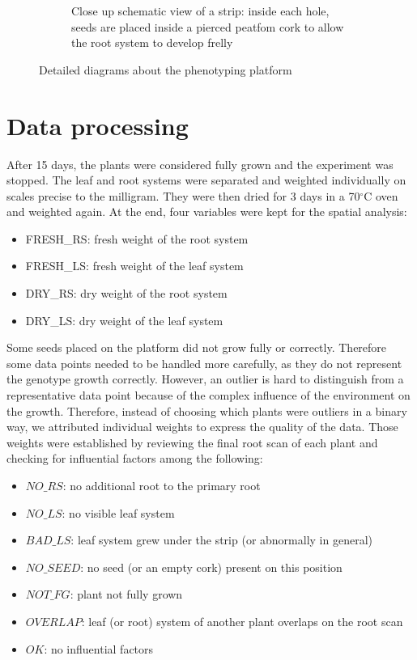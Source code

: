 \begin{figure}[!htb]
\begin{subfigure}[b]{0.475\textwidth}
            \caption{Close up schematic view of a strip: inside each hole, seeds are placed inside a pierced peatfom cork to allow the root system to develop frelly}    
            \label{fig:seed_platform_close_up}
        \end{subfigure}
        \caption{Detailed diagrams about the phenotyping platform}
    \end{figure}


\section{Data processing}
After 15 days, the plants were considered fully grown and the experiment was stopped. The leaf and root systems were separated and weighted individually on scales precise to the milligram. They were then dried for 3 days in a 70$^{\circ}$C oven and weighted again. At the end, four variables were kept for the spatial analysis:

\begin{itemize}
\item FRESH\_RS: fresh weight of the root system
\item FRESH\_LS: fresh weight of the leaf system
\item DRY\_RS: dry weight of the root system
\item DRY\_LS: dry weight of the leaf system
\end{itemize} 

Some seeds placed on the platform did not grow fully or correctly. Therefore some data points needed to be handled more carefully, as they do not represent the genotype growth correctly. However, an outlier is hard to distinguish from a representative data point because of the complex influence of the environment on the growth. Therefore, instead of choosing which plants were outliers in a binary way, we attributed individual weights to express the quality of the data. Those weights were established by reviewing the final root scan of each plant and checking for influential factors among the following:

\begin{itemize}
\item $NO\_RS$: no additional root to the primary root
\item $NO\_LS$: no visible leaf system 
\item $BAD\_LS$: leaf system grew under the strip (or abnormally in general)
\item  $NO\_SEED$: no seed (or an empty cork) present on this position
\item $NOT\_FG$: plant not fully grown
\item $OVERLAP$: leaf (or root) system of another plant overlaps on the root scan
\item $OK$: no influential factors
\end{itemize} 

